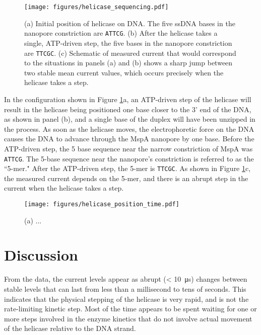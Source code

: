 \begin{figure}[h]
\begin{centering}
\texttt{[image: figures/helicase\_sequencing.pdf]}
\caption[Sequencing DNA with the help of a helicase]{(a) Initial position of helicase on DNA.  The five ssDNA bases in the nanopore constriction are \texttt{ATTCG}.  (b) After the helicase takes a single, ATP-driven step, the five bases in the nanopore constriction are \texttt{TTCGC}.  (c) Schematic of measured current that would correspond to the situations in panels (a) and (b) shows a sharp jump between two stable mean current values, which occurs precisely when the helicase takes a step.}
\label{fig:helicase_sequencing}
\end{centering}
\end{figure}

In the configuration shown in Figure \ref{fig:helicase_sequencing}a, an ATP-driven step of the helicase will result in the helicase being positioned one base closer to the 3’ end of the DNA, as shown in panel (b), and a single base of the duplex will have been unzipped in the process.  As soon as the helicase moves, the electrophoretic force on the DNA causes the DNA to advance through the MspA nanopore by one base.  Before the ATP-driven step, the 5 base sequence near the narrow constriction of MspA was \texttt{ATTCG}.  The 5-base sequence near the nanopore’s constriction is referred to as the ``5-mer."  After the ATP-driven step, the 5-mer is \texttt{TTCGC}.  As shown in Figure \ref{fig:helicase_sequencing}c, the measured current depends on the 5-mer, and there is an abrupt step in the current when the helicase takes a step.

\begin{figure}[h]
\begin{centering}
\texttt{[image: figures/helicase\_position\_time.pdf]}
\caption[Current levels reveal helicase movement]{(a) ...}
\label{fig:helicase_movement}
\end{centering}
\end{figure}

\section{Discussion}

From the data, the current levels appear as abrupt (< \SI{10}{\micro\s}) changes between stable levels that can last from less than a millisecond to tens of seconds.  This indicates that the physical stepping of the helicase is very rapid, and is not the rate-limiting kinetic step.  Most of the time appears to be spent waiting for one or more steps involved in the enzyme kinetics that do not involve actual movement of the helicase relative to the DNA strand.

